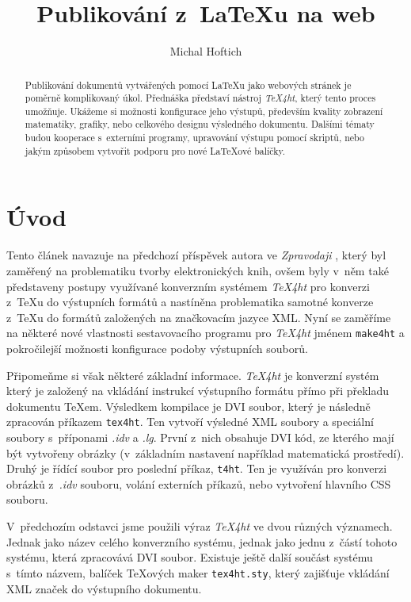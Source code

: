 \documentclass{csbulletin}
\newcommand\nazev[1]{\textit{#1}}
\newcommand\prikaz[1]{\texttt{#1}}
\begin{document}
\title{Publikování z~\LaTeX u na web}
\author{Michal Hoftich}
\maketitle

\begin{abstract}
Publikování dokumentů vytvářených pomocí \LaTeX u jako webových stránek je
poměrně komplikovaný úkol. Přednáška představí nástroj \nazev{TeX4ht}, který
tento proces umožňuje. Ukážeme si možnosti konfigurace jeho výstupů, především
kvality zobrazení matematiky, grafiky, nebo celkového designu výsledného
dokumentu. Dalšími tématy budou kooperace s~externími programy, upravování
výstupu pomocí skriptů, nebo jakým způsobem vytvořit podporu pro nové \LaTeX ové balíčky. 
\end{abstract}

\section{Úvod}



Tento článek navazuje na předchozí příspěvek autora ve \nazev{Zpravodaji}
\parencite{hoftich:16}, který byl zaměřený na problematiku tvorby
elektronických knih, ovšem byly v~něm také
představeny postupy využívané konverzním systémem \nazev{TeX4ht} pro konverzi
z~\TeX u do výstupních formátů a nastíněna problematika samotné konverze z~\TeX u
do formátů založených na značkovacím jazyce XML. 
Nyní se zaměříme na některé nové vlastnosti sestavovacího programu pro \nazev{TeX4ht} jménem
\prikaz{make4ht} a pokročilejší možnosti konfigurace podoby výstupních souborů.

Připomeňme si však některé základní informace. \nazev{TeX4ht} je konverzní
systém který je založený na vkládání instrukcí výstupního formátu přímo při
překladu dokumentu \TeX em. Výsledkem kompilace je DVI soubor, který je
následně zpracován příkazem \prikaz{tex4ht}. Ten vytvoří výsledné XML soubory a
speciální soubory s~příponami \nazev{.idv} a \nazev{.lg}.
První z~nich obsahuje DVI kód, ze kterého mají být vytvořeny obrázky
(v~základním nastavení například matematická prostředí). Druhý je řídící soubor
pro poslední příkaz, \prikaz{t4ht}. Ten je využíván pro konverzi obrázků
z~\nazev{.idv} souboru, volání externích příkazů, nebo vytvoření hlavního CSS
souboru.

V~předchozím odstavci jsme použili výraz \nazev{TeX4ht} ve dvou různých
významech. Jednak jako název celého konverzního systému, jednak jako jednu
z~částí tohoto systému, která zpracovává DVI soubor. Existuje ještě další součást
systému s~tímto názvem, balíček \TeX ových maker \prikaz{tex4ht.sty}, který
zajišťuje vkládání XML značek do výstupního dokumentu.
\end{document}
